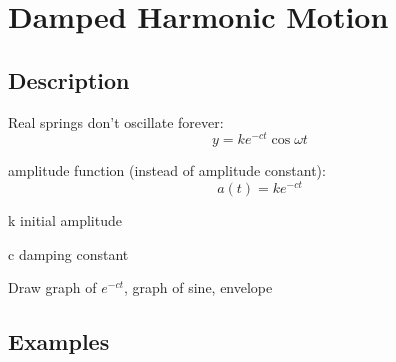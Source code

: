 \documentclass{exam}
\begin{document}
  \section{Damped Harmonic Motion}

  \subsection{Description}
  Real springs don't oscillate forever:
  \[
    y = k e^{-ct} \cos \omega t
  \]

  amplitude function (instead of amplitude constant):
  \[
    a(t) = k e^{-ct}
  \]

  \begin{description*}
    \item[k] initial amplitude
    \item[c] damping constant
  \end{description*}

  Draw graph of $e^{-ct}$, graph of sine, envelope

  \subsection{Examples}
\end{document}
